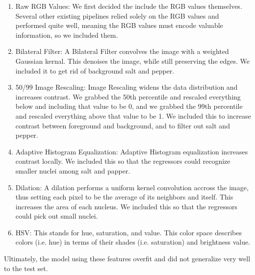 \documentclass[paper=letter, fontsize=12pt]{article}
\numberwithin{equation}{section} %
\numberwithin{figure}{section} %
\numberwithin{table}{section} %
\begin{document}
\begin{enumerate}
  \item Raw RGB Values:
  We first decided the include the RGB values themselves. Several other
  existing pipelines relied solely on the RGB values and performed quite well,
  meaning the RGB values must encode valuable information, so we included them.
  \item  Bilateral Filter:
  A Bilateral Filter convolves the image with a weighted Gaussian kernal. This
  denoises the image, while still preserving the edges. We included it to
  get rid of background salt and pepper.
  \item 50/99 Image Rescaling:
  Image Rescaling widens the data distribution and increases contrast. We grabbed
  the 50th percentile and rescaled everything below and including that value to
  be 0, and we grabbed the 99th percentile and rescaled everything above that
  value to be 1. We included this to increase contrast between foreground and background,
  and to filter out salt and pepper.
  \item Adaptive Histogram Equalization:
  Adaptive Histogram equalization increases contrast locally. We included this
  so that the regressors could recognize smaller nuclei among salt and papper.
  \item Dilation:
  A dilation performs a uniform kernel convolution accross the image, thus
  setting each pixel to be the average of its neighbors and itself. This increases
  the area of each nucleus. We included this so that the regressors could pick
  out small nuclei.
  \item HSV:
  This stands for hue, saturation, and value. This color space describes colors
  (i.e. hue) in terms of their shades (i.e. saturation) and brightness value.

\end{enumerate}

Ultimately, the model using these features overfit and did not generalize very
well to the test set. 
\end{document}
